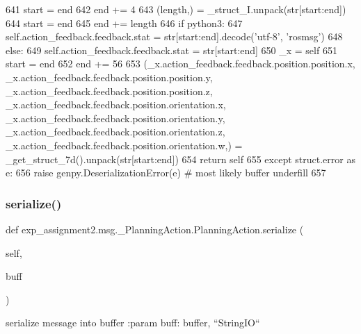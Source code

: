 \begin{DoxyCode}
641       start = end
642       end += 4
643       (length,) = \_struct\_I.unpack(str[start:end])
644       start = end
645       end += length
646       \textcolor{keywordflow}{if} python3:
647         self.action\_feedback.feedback.stat = str[start:end].decode(\textcolor{stringliteral}{'utf-8'}, \textcolor{stringliteral}{'rosmsg'})
648       \textcolor{keywordflow}{else}:
649         self.action\_feedback.feedback.stat = str[start:end]
650       \_x = self
651       start = end
652       end += 56
653       (\_x.action\_feedback.feedback.position.position.x, \_x.action\_feedback.feedback.position.position.y, 
      \_x.action\_feedback.feedback.position.position.z, \_x.action\_feedback.feedback.position.orientation.x, 
      \_x.action\_feedback.feedback.position.orientation.y, \_x.action\_feedback.feedback.position.orientation.z, 
      \_x.action\_feedback.feedback.position.orientation.w,) = \_get\_struct\_7d().unpack(str[start:end])
654       \textcolor{keywordflow}{return} self
655     \textcolor{keywordflow}{except} struct.error \textcolor{keyword}{as} e:
656       \textcolor{keywordflow}{raise} genpy.DeserializationError(e)  \textcolor{comment}{# most likely buffer underfill}
657 
\end{DoxyCode}
\mbox{\label{classexp__assignment2_1_1msg_1_1__PlanningAction_1_1PlanningAction_adefe8b8d64f50f881432f745c330a88f}} 
\subsubsection{\texorpdfstring{serialize()}{serialize()}}
{\footnotesize\ttfamily def exp\+\_\+assignment2.\+msg.\+\_\+\+Planning\+Action.\+Planning\+Action.\+serialize (\begin{DoxyParamCaption}\item[{}]{self,  }\item[{}]{buff }\end{DoxyParamCaption})}

\begin{DoxyVerb}serialize message into buffer
:param buff: buffer, ``StringIO``
\end{DoxyVerb}
 


